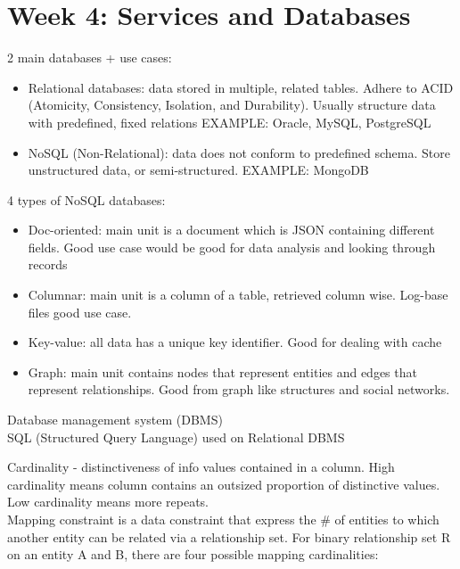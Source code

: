 \documentclass[11pt]{article}
\begin{document}
\section*{Week 4: Services and Databases}
2 main databases + use cases:

\begin{itemize}
\item
  Relational databases: data stored in multiple, related tables. Adhere
  to ACID (Atomicity, Consistency, Isolation, and Durability). Usually
  structure data with predefined, fixed relations EXAMPLE: Oracle,
  MySQL, PostgreSQL\\
\item
  NoSQL (Non-Relational): data does not conform to predefined schema.
  Store unstructured data, or semi-structured. EXAMPLE: MongoDB
\end{itemize}

4 types of NoSQL databases:

\begin{itemize}
\item
  Doc-oriented: main unit is a document which is JSON containing
  different fields. Good use case would be good for data analysis and
  looking through records\\
\item
  Columnar: main unit is a column of a table, retrieved column wise.
  Log-base files good use case.\\
\item
  Key-value: all data has a unique key identifier. Good for dealing with
  cache\\
\item
  Graph: main unit contains nodes that represent entities and edges that
  represent relationships. Good from graph like structures and social
  networks.
\end{itemize}

Database management system (DBMS)\\
SQL (Structured Query Language) used on Relational DBMS

Cardinality - distinctiveness of info values contained in a column. High
cardinality means column contains an outsized proportion of distinctive
values. Low cardinality means more repeats.\\
Mapping constraint is a data constraint that express the \# of entities
to which another entity can be related via a relationship set. For
binary relationship set R on an entity A and B, there are four possible
mapping cardinalities:
\end{document}
